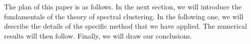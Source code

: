 The plan of this paper is as follows. In the next section, we will introduce the fundamentals of the theory of spectral clustering. In the following one, we will describe the details of the specific method that we have applied. The numerical results will then follow. Finally, we will draw our conclusions. 
